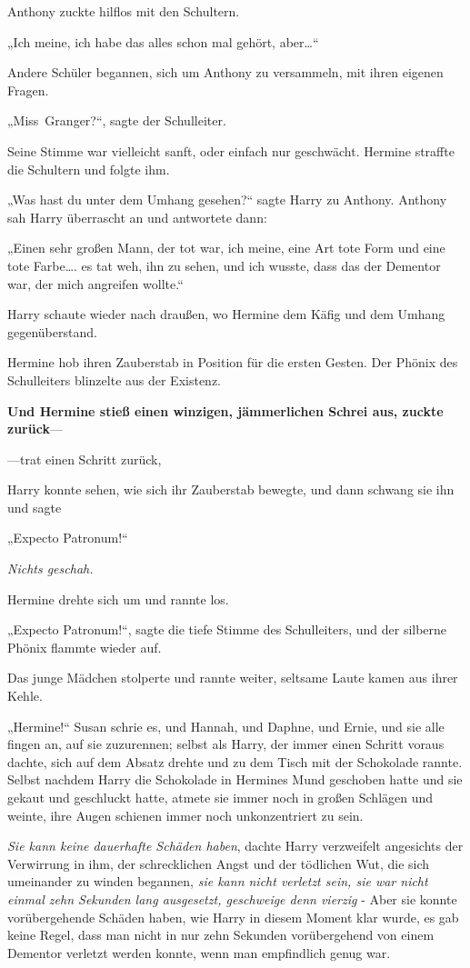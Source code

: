 {Anthony zuckte hilflos mit den Schultern.

„Ich meine, ich habe das alles schon mal gehört, aber…“

Andere Schüler begannen, sich um Anthony zu versammeln, mit ihren eigenen Fragen.

„Miss~Granger?“, sagte der Schulleiter.

Seine Stimme war vielleicht sanft, oder einfach nur geschwächt. Hermine straffte die Schultern und folgte ihm.

„Was hast du unter dem Umhang gesehen?“ sagte Harry zu Anthony. Anthony sah Harry überrascht an und antwortete dann:

„Einen sehr großen Mann, der tot war, ich meine, eine Art tote Form und eine tote Farbe…. es tat weh, ihn zu sehen, und ich wusste, dass das der Dementor war, der mich angreifen wollte.“

Harry schaute wieder nach draußen, wo Hermine dem Käfig und dem Umhang gegenüberstand.

Hermine hob ihren Zauberstab in Position für die ersten Gesten. Der Phönix des Schulleiters blinzelte aus der Existenz.

\textbf{Und Hermine stieß einen winzigen, jämmerlichen Schrei aus, zuckte zurück}—

—trat einen Schritt zurück,

Harry konnte sehen, wie sich ihr Zauberstab bewegte, und dann schwang sie ihn und sagte

„Expecto Patronum!“

\emph{Nichts geschah.}

Hermine drehte sich um und rannte los.

„Expecto Patronum!“, sagte die tiefe Stimme des Schulleiters, und der silberne Phönix flammte wieder auf.

Das junge Mädchen stolperte und rannte weiter, seltsame Laute kamen aus ihrer Kehle.

„Hermine!“ Susan schrie es, und Hannah, und Daphne, und Ernie, und sie alle fingen an, auf sie zuzurennen; selbst als Harry, der immer einen Schritt voraus dachte, sich auf dem Absatz drehte und zu dem Tisch mit der Schokolade rannte. Selbst nachdem Harry die Schokolade in Hermines Mund geschoben hatte und sie gekaut und geschluckt hatte, atmete sie immer noch in großen Schlägen und weinte, ihre Augen schienen immer noch unkonzentriert zu sein.

\emph{Sie kann keine dauerhafte Schäden haben}, dachte Harry verzweifelt angesichts der Verwirrung in ihm, der schrecklichen Angst und der tödlichen Wut, die sich umeinander zu winden begannen, \emph{sie kann nicht verletzt sein, sie war nicht einmal zehn Sekunden lang ausgesetzt, geschweige denn vierzig} - Aber sie konnte vorübergehende Schäden haben, wie Harry in diesem Moment klar wurde, es gab keine Regel, dass man nicht in nur zehn Sekunden vorübergehend von einem Dementor verletzt werden konnte, wenn man empfindlich genug war.

}
